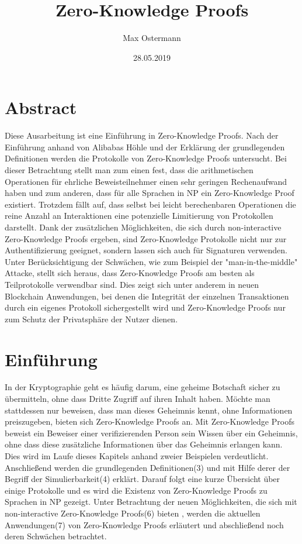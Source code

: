 \documentclass {article}
\title{Zero-Knowledge Proofs}
\author{Max Ostermann}
\date{28.05.2019}
\begin{document}
\maketitle
{}
\newpage
{}

\section{Abstract}


Diese Ausarbeitung ist eine Einf\"uhrung in Zero-Knowledge Proofs.
Nach der Einf\"uhrung anhand von Alibabas H\"ohle und der Erkl\"arung der grundlegenden Definitionen werden die Protokolle von Zero-Knowledge Proofs untersucht.
Bei dieser Betrachtung stellt man zum einen fest, dass die arithmetischen Operationen für ehrliche Beweisteilnehmer einen sehr geringen Rechenaufwand haben und zum anderen, dass f\"ur alle Sprachen in NP ein Zero-Knowledge Proof existiert. Trotzdem f\"allt auf, dass selbst bei leicht berechenbaren Operationen die reine Anzahl an Interaktionen eine potenzielle Limitierung von Protokollen darstellt.
Dank der zus\"atzlichen M\"oglichkeiten, die sich durch non-interactive Zero-Knowledge Proofs ergeben, sind Zero-Knowledge Protokolle nicht nur zur Authentifizierung geeignet, sondern lassen sich auch für Signaturen verwenden.
Unter Ber\"ucksichtigung der Schw\"achen, wie zum Beispiel der "man-in-the-middle" Attacke, stellt sich heraus, dass Zero-Knowledge Proofs am besten als Teilprotokolle verwendbar sind. Dies zeigt sich unter anderem in neuen Blockchain Anwendungen, bei denen die Integrität der einzelnen Transaktionen durch ein eigenes Protokoll sichergestellt wird und Zero-Knowledge Proofs nur zum Schutz der Privatsph\"are der Nutzer dienen.
\\


\newpage

\tableofcontents

\newpage 

\section{Einf\"uhrung}

In der Kryptographie geht es häufig darum, eine geheime Botschaft sicher zu übermitteln, ohne dass Dritte Zugriff auf ihren Inhalt haben. Möchte man stattdessen nur beweisen, dass man dieses Geheimnis kennt, ohne Informationen preiszugeben, bieten sich Zero-Knowledge Proofs an. Mit Zero-Knowledge Proofs beweist ein Beweiser einer verifizierenden Person sein Wissen über ein Geheimnis, ohne dass diese zusätzliche Informationen über das Geheimnis erlangen kann.\\
Dies wird im Laufe dieses Kapitels anhand zweier Beispielen verdeutlicht. Anschließend werden die grundlegenden Definitionen(3) und mit Hilfe derer der Begriff der Simulierbarkeit(4) erklärt. 
Darauf folgt eine kurze \"Ubersicht über einige Protokolle und es wird die Existenz von Zero-Knowledge Proofs zu Sprachen in NP gezeigt. Unter Betrachtung der neuen M\"oglichkeiten, die sich mit non-interactive Zero-Knowledge Proofs(6) bieten , werden die aktuellen Anwendungen(7) von Zero-Knowledge Proofs erl\"autert und abschließend noch deren Schw\"achen betrachtet.
\\
\end{document}
